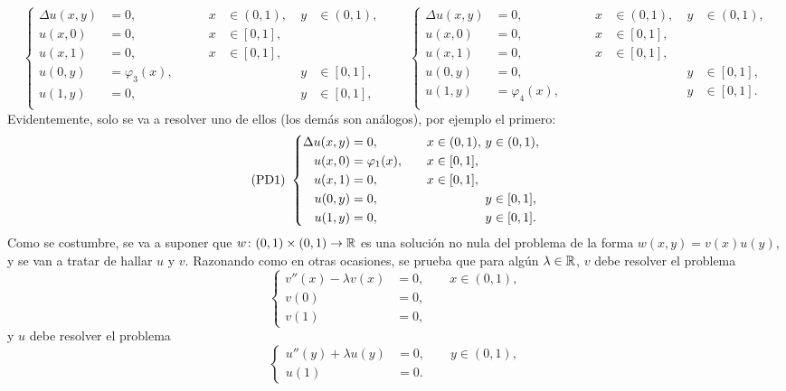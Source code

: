\documentclass[a4paper, 12pt, extrafontsizes]{memoir}
\begin{document}
\[\left\{\begin{alignedat}{5}
    \Delta u(x,y) &= 0, \qquad & x &\in (0,1), \ & y &\in (0,1), \\
    u(x,0) &= 0, \qquad & x &\in [0,1], & & \\
    u(x,1) &= 0, \qquad & x &\in [0,1], & & \\
    u(0,y) &= \varphi_3(x), \qquad & & & y &\in [0,1], \\
    u(1,y) &= 0, \qquad & & & y &\in [0,1], \\
\end{alignedat}\right. \qquad \left\{\begin{alignedat}{5}
    \Delta u(x,y) &= 0, \qquad & x &\in (0,1), \ & y &\in (0,1), \\
    u(x,0) &= 0, \qquad & x &\in [0,1], & & \\
    u(x,1) &= 0, \qquad & x &\in [0,1], & & \\
    u(0,y) &= 0, \qquad & & & y &\in [0,1], \\
    u(1,y) &= \varphi_4(x), \qquad & & & y &\in [0,1]. \\
\end{alignedat}\right.\]
Evidentemente, solo se va a resolver uno de ellos (los demás son análogos), por ejemplo el primero:
\[\textup{(PD1)} \ \left\{\begin{alignedat}{5}
    \Delta u(x,y) &= 0, \qquad & x &\in (0,1), \ & y &\in (0,1), \\
    u(x,0) &= \varphi_1(x), \qquad & x &\in [0,1], & & \\
    u(x,1) &= 0, \qquad & x &\in [0,1], & & \\
    u(0,y) &= 0, \qquad & & & y &\in [0,1], \\
    u(1,y) &= 0, \qquad & & & y &\in [0,1]. \\
\end{alignedat}\right.\]
Como se costumbre, se va a suponer que $w \colon (0,1) \times (0,1) \to \mathbb R$ es una solución no nula del problema de la forma $w(x,y)=v(x)u(y)$, y se van a tratar de hallar $u$ y $v$. Razonando como en otras ocasiones, se prueba que para algún $\lambda  \in \mathbb R$, $v$ debe resolver el problema
\[
\left\{\begin{alignedat}{1}
    v''(x)-\lambda v(x) &= 0, \qquad x \in (0,1), \\
    v(0) &= 0, \\
    v(1) &= 0,
\end{alignedat}\right.
\]
y $u$ debe resolver el problema
\[\left\{\begin{alignedat}{1}
    u''(y)+\lambda u(y) &= 0, \qquad y \in (0,1), \\
    u(1) &= 0.
\end{alignedat}\right.\]
\end{document}

